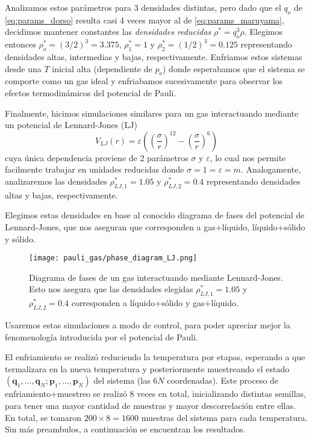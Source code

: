 Analizamos estos parámetros para 3 densidades distintas, pero dado que el $q_o$ de \eqref{eq:params_dorso} resulta casi 4 veces mayor al de \eqref{eq:params_maruyama}, decidimos mantener
constantes las \textit{densidades reducidas} $\rho^* = q_o^3\rho$.
Elegimos entonces $\rho_o^* = (3/2)^3 = 3.375 $, $\rho_1^* = 1 $ y $\rho_2^* = (1/2)^3 = 0.125 $ representando densidades altas, intermedias y bajas, respectivamente.
Enfriamos estos sistemas desde una $T$ inicial alta (dependiente de $p_o$) donde esperabamos que el sistema se comporte como un gas ideal y enfriabamos sucesivamente para observar los
efectos termodinámicos del potencial de Pauli.

Finalmente, hicimos simulaciones similares para un gas interactuando mediante un potencial de Lennard-Jones (LJ)
\[ V_{LJ}(r) = \varepsilon\left( \left( \frac{\sigma}{r} \right)^{12} - \left( \frac{\sigma}{r} \right)^6 \right) \]
cuya única dependencia proviene de 2 parámetros $\sigma$ y $\varepsilon$, lo cual nos permite facilmente trabajar en unidades reducidas donde $\sigma=1=\varepsilon=m$.
Analogamente, analizaremos las densidades $\rho_{LJ,1}^* = 1.05$ y $\rho_{LJ,2}^* = 0.4$ representando densidades altas y bajas, respectivamente.

Elegimos estas densidades en base al conocido diagrama de fases del potencial de Lennard-Jones, que nos aseguran que corresponden a gas+líquido, líquido+sólido y sólido.

\begin{figure}[h]
	\centering
	\texttt{[image: pauli\_gas/phase\_diagram\_LJ.png]}
	\caption{Diagrama de fases de un gas interactuando mediante Lennard-Jones.
	Esto nos asegura que las densidades elegidas $\rho_{LJ,1}^* = 1.05$ y $\rho_{LJ,2}^* = 0.4$ corresponden a líquido+sólido y gas+líquido.}
	\label{fig:ej_diag_fases_LJ}
\end{figure}

Usaremos estas simulaciones a modo de control, para poder apreciar mejor la fenomenología introducida por el potencial de Pauli.

El enfriamiento se realizó reduciendo la temperatura por etapas, esperando a que termalizara en la nueva temperatura y posteriormente muestreando el estado
$(\mathbf{q}_1, ..., \mathbf{q}_N;\mathbf{p}_1, ..., \mathbf{p}_N)$ del sistema (las $6N$ coordenadas).
Este proceso de enfriamiento+muestreo se realizó 8 veces en total, inicializando distintas semillas, para tener una mayor cantidad de muestras y mayor descorrelación entre ellas.
En total, se tomaron $200\times 8 = 1600$ muestras del sistema para cada temperatura.
Sin más preambulos, a continuación se encuentran los resultados.


